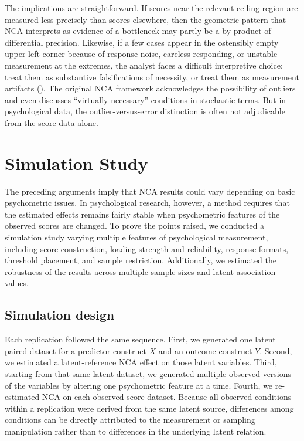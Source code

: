 \documentclass[
  man,
  longtable,
  nolmodern,
  notxfonts,
  notimes,
  colorlinks=true,linkcolor=blue,citecolor=blue,urlcolor=blue]{apa7}
\begin{document}
The implications are straightforward. If scores near the relevant
ceiling region are measured less precisely than scores elsewhere, then
the geometric pattern that NCA interprets as evidence of a bottleneck
may partly be a by-product of differential precision. Likewise, if a few
cases appear in the ostensibly empty upper-left corner because of
response noise, careless responding, or unstable measurement at the
extremes, the analyst faces a difficult interpretive choice: treat them
as substantive falsifications of necessity, or treat them as measurement
artifacts ().
The original NCA framework acknowledges the possibility of outliers and
even discusses ``virtually necessary'' conditions in stochastic terms.
But in psychological data, the outlier-versus-error distinction is often
not adjudicable from the score data alone.

\section{Simulation Study}\label{simulation-study}

The preceding arguments imply that NCA results could vary depending on
basic psychometric issues. In psychological research, however, a method
requires that the estimated effects remains fairly stable when
psychometric features of the observed scores are changed. To prove the
points raised, we conducted a simulation study varying multiple features
of psychological measurement, including score construction, loading
strength and reliability, response formats, threshold placement, and
sample restriction. Additionally, we estimated the robustness of the
results across multiple sample sizes and latent association values.

\subsection{Simulation design}\label{simulation-design}

Each replication followed the same sequence. First, we generated one
latent paired dataset for a predictor construct \(X\) and an outcome
construct \(Y\). Second, we estimated a latent-reference NCA effect on
those latent variables. Third, starting from that same latent dataset,
we generated multiple observed versions of the variables by altering one
psychometric feature at a time. Fourth, we re-estimated NCA on each
observed-score dataset. Because all observed conditions within a
replication were derived from the same latent source, differences among
conditions can be directly attributed to the measurement or sampling
manipulation rather than to differences in the underlying latent
relation.
\end{document}
